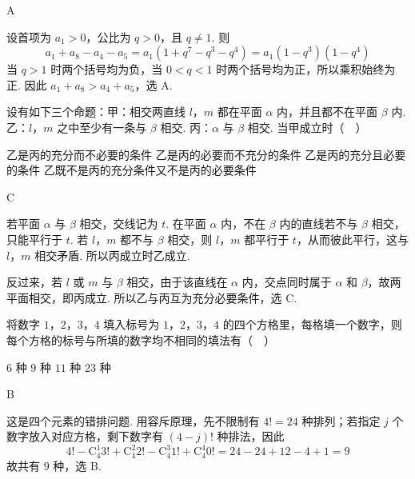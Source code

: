 \begin{answer}
A
\end{answer}

\begin{solution}
设首项为 \(a_1>0\)，公比为 \(q>0\)，且 \(q\neq1\). 则
\[
a_1+a_8-a_4-a_5
=a_1(1+q^7-q^3-q^4)
=a_1(1-q^3)(1-q^4)
\]
当 \(q>1\) 时两个括号均为负，当 \(0<q<1\) 时两个括号均为正，所以乘积始终为正. 因此 \(a_1+a_8>a_4+a_5\)，选 A.
\end{solution}

\begin{problem}
设有如下三个命题：甲：相交两直线 \(l\)，\(m\) 都在平面 \(\alpha\) 内，并且都不在平面 \(\beta\) 内. 乙：\(l\)，\(m\) 之中至少有一条与 \(\beta\) 相交. 丙：\(\alpha\) 与 \(\beta\) 相交. 当甲成立时（\(\quad\)）

\choices
    {乙是丙的充分而不必要的条件}
    {乙是丙的必要而不充分的条件}
    {乙是丙的充分且必要的条件}
    {乙既不是丙的充分条件又不是丙的必要条件}
\end{problem}

\begin{answer}
C
\end{answer}

\begin{solution}
若平面 \(\alpha\) 与 \(\beta\) 相交，交线记为 \(t\). 在平面 \(\alpha\) 内，不在 \(\beta\) 内的直线若不与 \(\beta\) 相交，只能平行于 \(t\). 若 \(l\)，\(m\) 都不与 \(\beta\) 相交，则 \(l\)，\(m\) 都平行于 \(t\)，从而彼此平行，这与 \(l\)，\(m\) 相交矛盾. 所以丙成立时乙成立.

反过来，若 \(l\) 或 \(m\) 与 \(\beta\) 相交，由于该直线在 \(\alpha\) 内，交点同时属于 \(\alpha\) 和 \(\beta\)，故两平面相交，即丙成立. 所以乙与丙互为充分必要条件，选 C.
\end{solution}

\begin{problem}
将数字 \(1\)，\(2\)，\(3\)，\(4\) 填入标号为 \(1\)，\(2\)，\(3\)，\(4\) 的四个方格里，每格填一个数字，则每个方格的标号与所填的数字均不相同的填法有（\(\quad\)）

\choices
    {\(6\) 种}
    {\(9\) 种}
    {\(11\) 种}
    {\(23\) 种}
\end{problem}

\begin{answer}
B
\end{answer}

\begin{solution}
这是四个元素的错排问题. 用容斥原理，先不限制有 \(4!=24\) 种排列；若指定 \(j\) 个数字放入对应方格，剩下数字有 \((4-j)!\) 种排法，因此
\[
4!-\mathrm C_4^1 3!+\mathrm C_4^2 2!-\mathrm C_4^3 1!+\mathrm C_4^4 0!
=24-24+12-4+1=9
\]
故共有 \(9\) 种，选 B.
\end{solution}

